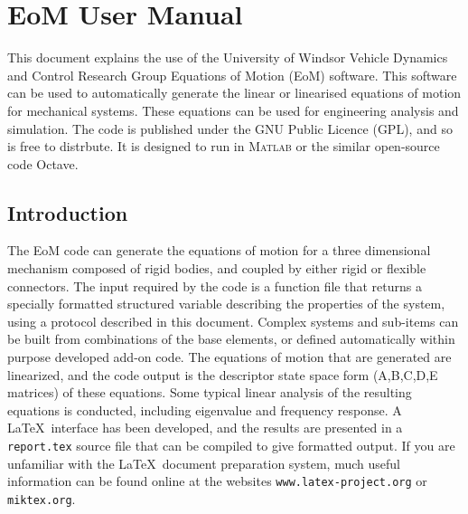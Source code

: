 \chapter{EoM User Manual}

This document explains the use of the University of Windsor Vehicle Dynamics and Control Research Group Equations of Motion (EoM) software. This software can be used to automatically generate the linear or linearised equations of motion for mechanical systems. These equations can be used for engineering analysis and simulation.  The code is published under the GNU Public Licence (GPL), and so is free to distrbute.  It is designed to run in M{\scshape atlab}\textsuperscript{\textregistered} or the similar open-source code Octave.

\section{Introduction}
The EoM code can generate the equations of motion for a three dimensional mechanism composed of rigid bodies, and coupled by either rigid or flexible connectors.  The input required by the code is a function file that returns a specially formatted structured variable describing the properties of the system, using a protocol described in this document.  Complex systems and sub-items can be built from combinations of the base elements, or defined automatically within purpose developed add-on code.  The equations of motion that are generated are linearized, and the code output is the descriptor state space form (A,B,C,D,E matrices) of these equations.  Some typical linear analysis of the resulting equations is conducted, including eigenvalue and frequency response.  A \LaTeX\ interface has been developed, and the results are presented in a \texttt{report.tex} source file that can be compiled to give formatted output.  If you are unfamiliar with the \LaTeX\ document preparation system, much useful information can be found online at the websites \texttt{www.latex-project.org} or \texttt{miktex.org}.

